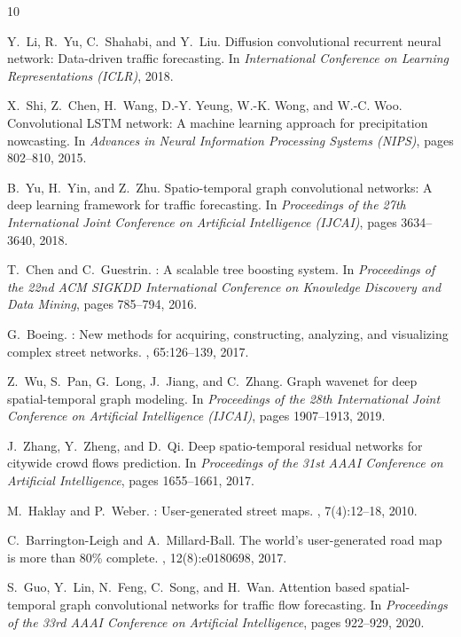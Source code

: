 \documentclass[10pt,twocolumn]{article}
\begin{document}
\begin{thebibliography}{10}

Y.~Li, R.~Yu, C.~Shahabi, and Y.~Liu.
\newblock Diffusion convolutional recurrent neural network: Data-driven traffic forecasting.
\newblock In {\em International Conference on Learning Representations (ICLR)}, 2018.

X.~Shi, Z.~Chen, H.~Wang, D.-Y. Yeung, W.-K. Wong, and W.-C. Woo.
\newblock Convolutional {LSTM} network: A machine learning approach for precipitation nowcasting.
\newblock In {\em Advances in Neural Information Processing Systems (NIPS)}, pages 802--810, 2015.

B.~Yu, H.~Yin, and Z.~Zhu.
\newblock Spatio-temporal graph convolutional networks: A deep learning framework for traffic forecasting.
\newblock In {\em Proceedings of the 27th International Joint Conference on Artificial Intelligence (IJCAI)}, pages 3634--3640, 2018.

T.~Chen and C.~Guestrin.
: A scalable tree boosting system.
\newblock In {\em Proceedings of the 22nd ACM SIGKDD International Conference on Knowledge Discovery and Data Mining}, pages 785--794, 2016.

G.~Boeing.
: New methods for acquiring, constructing, analyzing, and visualizing complex street networks.
, 65:126--139, 2017.

Z.~Wu, S.~Pan, G.~Long, J.~Jiang, and C.~Zhang.
\newblock Graph wavenet for deep spatial-temporal graph modeling.
\newblock In {\em Proceedings of the 28th International Joint Conference on Artificial Intelligence (IJCAI)}, pages 1907--1913, 2019.

J.~Zhang, Y.~Zheng, and D.~Qi.
\newblock Deep spatio-temporal residual networks for citywide crowd flows prediction.
\newblock In {\em Proceedings of the 31st AAAI Conference on Artificial Intelligence}, pages 1655--1661, 2017.

M.~Haklay and P.~Weber.
: User-generated street maps.
, 7(4):12--18, 2010.

C.~Barrington-Leigh and A.~Millard-Ball.
\newblock The world's user-generated road map is more than 80\% complete.
, 12(8):e0180698, 2017.

S.~Guo, Y.~Lin, N.~Feng, C.~Song, and H.~Wan.
\newblock Attention based spatial-temporal graph convolutional networks for traffic flow forecasting.
\newblock In {\em Proceedings of the 33rd AAAI Conference on Artificial Intelligence}, pages 922--929, 2020.

\end{thebibliography}
\end{document}
